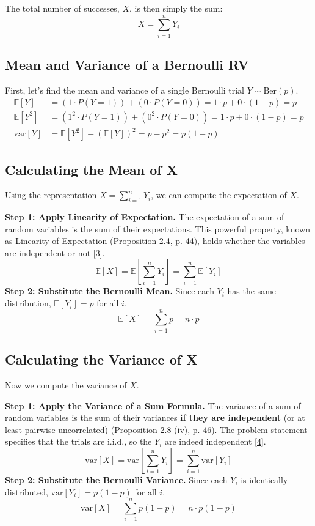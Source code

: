 \documentclass[11pt,a4paper]{article}
\theoremstyle{named}
\begin{document}
The total number of successes, $X$, is then simply the sum:
\[
X = \sum_{i=1}^n Y_i
\]

\subsection{Mean and Variance of a Bernoulli RV}
First, let's find the mean and variance of a single Bernoulli trial $Y \sim \text{Ber}(p)$.
\begin{align*}
    \mathbb{E}[Y] &= (1 \cdot P(Y=1)) + (0 \cdot P(Y=0)) = 1 \cdot p + 0 \cdot (1-p) = p \\
    \mathbb{E}[Y^2] &= (1^2 \cdot P(Y=1)) + (0^2 \cdot P(Y=0)) = 1 \cdot p + 0 \cdot (1-p) = p \\
    \text{var}[Y] &= \mathbb{E}[Y^2] - (\mathbb{E}[Y])^2 = p - p^2 = p(1-p)
\end{align*}

\subsection{Calculating the Mean of X}
Using the representation $X = \sum_{i=1}^n Y_i$, we can compute the expectation of $X$.

\textbf{Step 1: Apply Linearity of Expectation.}
The expectation of a sum of random variables is the sum of their expectations. This powerful property, known as Linearity of Expectation (Proposition 2.4, p. 44), holds whether the variables are independent or not \hyperlink{note:3}{[3]}.
\[
\mathbb{E}[X] = \mathbb{E}\left[\sum_{i=1}^n Y_i\right] = \sum_{i=1}^n \mathbb{E}[Y_i]
\]
\textbf{Step 2: Substitute the Bernoulli Mean.}
Since each $Y_i$ has the same distribution, $\mathbb{E}[Y_i] = p$ for all $i$.
\[
\mathbb{E}[X] = \sum_{i=1}^n p = n \cdot p
\]

\subsection{Calculating the Variance of X}
Now we compute the variance of $X$.

\textbf{Step 1: Apply the Variance of a Sum Formula.}
The variance of a sum of random variables is the sum of their variances \textbf{if they are independent} (or at least pairwise uncorrelated) (Proposition 2.8 (iv), p. 46). The problem statement specifies that the trials are i.i.d., so the $Y_i$ are indeed independent \hyperlink{note:4}{[4]}.
\[
\text{var}[X] = \text{var}\left[\sum_{i=1}^n Y_i\right] = \sum_{i=1}^n \text{var}[Y_i]
\]
\textbf{Step 2: Substitute the Bernoulli Variance.}
Since each $Y_i$ is identically distributed, $\text{var}[Y_i] = p(1-p)$ for all $i$.
\[
\text{var}[X] = \sum_{i=1}^n p(1-p) = n \cdot p(1-p)
\]
\end{document}
